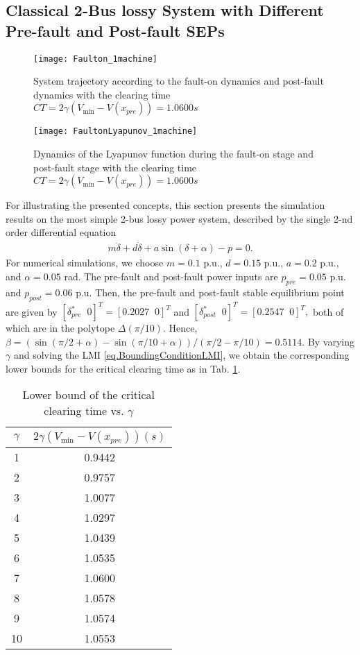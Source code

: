 \documentclass[final]{IEEEtran}
\begin{document}
\subsection{Classical 2-Bus lossy System with Different Pre-fault and Post-fault SEPs}
\begin{figure}[t!]
\centering
\texttt{[image: Faulton\_1machine]}
\caption{System trajectory according to the fault-on dynamics and
post-fault dynamics with the clearing time $CT=2\gamma
(V_{\min}-V(x_{pre}))=1.0600 s$} \label{fig.Trajectory}
\end{figure}

\begin{figure}[t!]
\centering
\texttt{[image: FaultonLyapunov\_1machine]}
\caption{Dynamics of the Lyapunov function during the fault-on
stage and post-fault stage with the clearing time $CT=2\gamma
(V_{\min}-V(x_{pre}))=1.0600 s$} \label{fig.Lyapunov}
\end{figure}

For illustrating the presented concepts, this section presents the
simulation results on the most simple 2-bus lossy power system,
described by the single 2-nd order differential equation
\begin{align}
  m \ddot{\delta} +d \dot{\delta} + a \sin(\delta+\alpha) - p=0.
\end{align}
For numerical simulations, we choose $m=0.1$ p.u., $d=0.15$ p.u.,
$a= 0.2$ p.u., and $\alpha=0.05$ rad. The pre-fault and post-fault
power inputs are $p_{pre}=0.05$ p.u. and $p_{post}=0.06$ p.u.
Then, the pre-fault and post-fault stable equilibrium point are
given by $[\delta^*_{pre} \;\;0]^T=[0.2027 \;\; 0]^T$ and
$[\delta^*_{post} \;\;0]^T=[0.2547 \;\; 0]^T,$ both of which are
in the polytope $\Delta(\pi/10).$ Hence,
$\beta=(\sin(\pi/2+\alpha)-\sin(\pi/10+\alpha))/(\pi/2-\pi/10)=0.5114.$
By varying $\gamma$ and solving the LMI
\eqref{eq.BoundingConditionLMI}, we obtain the corresponding lower
bounds for the critical clearing time as in Tab. \ref{tab.CCT}.

\begin{table}[ht!]
\centering
\begin{tabular}{|c|c|}
  \hline
$\gamma$ & $2\gamma (V_{\min}-V(x_{pre})) (s)$ \\
  \hline
  1 &  0.9442 \\
  2 & 0.9757 \\
  3 & 1.0077 \\
  4 & 1.0297 \\
  5 & 1.0439\\
  6 &  1.0535\\
  7 & 1.0600 \\
  8 &  1.0578 \\
  9 & 1.0574\\
 10 & 1.0553\\
  \hline
\end{tabular}
\caption{Lower bound of the critical clearing time vs.
$\gamma$}\label{tab.CCT}
\end{table}
\end{document}
